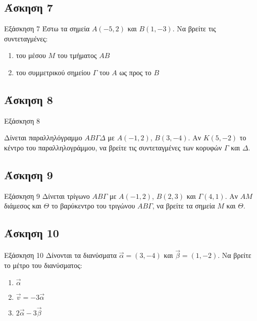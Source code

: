\documentclass[greek]{beamer}
\begin{document}
\subsection{Άσκηση 7}
\begin{frame}[label=Άσκηση7,t]{Εξάσκηση 7}
      Έστω τα σημεία $Α(-5,2)$ και $Β(1,-3)$. Να βρείτε τις συντεταγμένες:
      \begin{enumerate}
            \item<1-> του μέσου $Μ$ του τμήματος $ΑΒ$
            \item<2-> του συμμετρικού σημείου $Γ$ του $Α$ ως προς το $Β$
      \end{enumerate}

\end{frame}

\subsection{Άσκηση 8}
\begin{frame}[label=Άσκηση8,t]{Εξάσκηση 8}

      Δίνεται παραλληλόγραμμο $ΑΒΓΔ$ με $Α(-1,2)$, $Β(3,-4)$. Αν $Κ(5,-2)$ το κέντρο του παραλληλογράμμου, να βρείτε τις συντεταγμένες των κορυφών $Γ$ και $Δ$.

\end{frame}

\subsection{Άσκηση 9}
\begin{frame}[label=Άσκηση9,t]{Εξάσκηση 9}
      Δίνεται τρίγωνο $ΑΒΓ$ με $Α(-1,2)$, $Β(2,3)$ και $Γ(4,1)$. Αν $ΑΜ$ διάμεσος και $Θ$ το βαρύκεντρο του τριγώνου $ΑΒΓ$, να βρείτε τα σημεία $Μ$ και $Θ$.
\end{frame}

\subsection{Άσκηση 10}
\begin{frame}[label=Άσκηση10,t]{Εξάσκηση 10}
      Δίνονται τα διανύσματα $\vec{α}=(3,-4)$ και $\vec{β}=(1,-2)$. Να βρείτε το μέτρο του διανύσματος:
      \begin{enumerate}
            \item<1-> $\vec{α}$
            \item<2-> $\vec{v}=-3\vec{α}$
            \item<3-> $2\vec{α}-3\vec{β}$
      \end{enumerate}
\end{frame}
\end{document}
